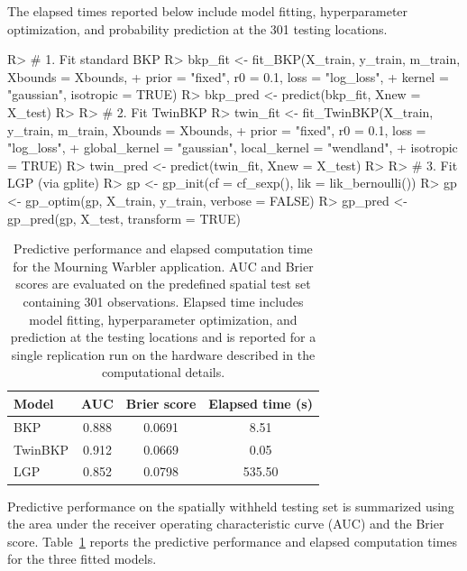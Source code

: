 \documentclass[article, shortnames]{jss}
\begin{document}
The elapsed times reported below include model fitting, hyperparameter optimization, and probability prediction at the 301 testing locations.

\begin{CodeChunk}
\begin{CodeInput}
R> # 1. Fit standard BKP
R> bkp_fit <- fit_BKP(X_train, y_train, m_train, Xbounds = Xbounds,
+                     prior = "fixed", r0 = 0.1, loss = "log_loss",
+                     kernel = "gaussian", isotropic = TRUE)
R> bkp_pred <- predict(bkp_fit, Xnew = X_test)
R>
R> # 2. Fit TwinBKP
R> twin_fit <- fit_TwinBKP(X_train, y_train, m_train, Xbounds = Xbounds,
+                          prior = "fixed", r0 = 0.1, loss = "log_loss",
+                          global_kernel = "gaussian", local_kernel = "wendland",
+                          isotropic = TRUE)
R> twin_pred <- predict(twin_fit, Xnew = X_test)
R>
R> # 3. Fit LGP (via gplite)
R> gp <- gp_init(cf = cf_sexp(), lik = lik_bernoulli())
R> gp <- gp_optim(gp, X_train, y_train, verbose = FALSE)
R> gp_pred <- gp_pred(gp, X_test, transform = TRUE)
\end{CodeInput}
\end{CodeChunk}

\begin{table}[!t]
	\centering
	\begin{tabular}{lccc}
		\toprule
		Model & AUC & Brier score & Elapsed time (s) \\
		\midrule
		BKP     & 0.888 & 0.0691 & 8.51 \\
		TwinBKP & 0.912 & 0.0669 & 0.05 \\
		LGP     & 0.852 & 0.0798 & 535.50 \\
		\bottomrule
	\end{tabular}
	\caption{Predictive performance and elapsed computation time for the Mourning Warbler application.
	AUC and Brier scores are evaluated on the predefined spatial test set containing 301 observations.
	Elapsed time includes model fitting, hyperparameter optimization, and prediction at the testing locations and is reported for a single replication run on the hardware described in the computational details.}
	\label{tab:model_comparison}
\end{table}

Predictive performance on the spatially withheld testing set is summarized using the area under the receiver operating characteristic curve (AUC) and the Brier score.
Table~\ref{tab:model_comparison} reports the predictive performance and elapsed computation times for the three fitted models.
\end{document}
